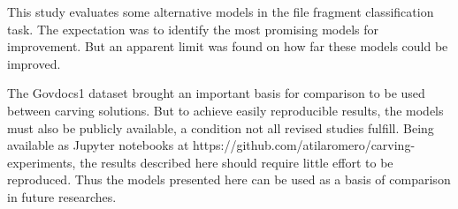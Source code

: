 This study evaluates some alternative models in the file fragment classification task. The expectation was to identify the most promising models for improvement. But an apparent limit was found on how far these models could be improved.

The Govdocs1 dataset brought an important basis for comparison to be used between carving solutions. But to achieve easily reproducible results, the models must also be publicly available, a condition not all revised studies fulfill. Being available as Jupyter notebooks at https://github.com/atilaromero/carving-experiments, the results described here should require little effort to be reproduced. Thus the models presented here can be used as a basis of comparison in  future researches.
